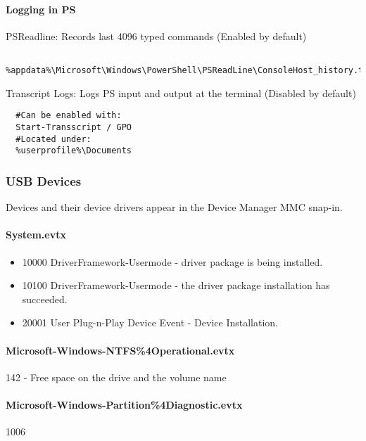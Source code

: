 \paragraph{Logging in PS}
PSReadline: Records last 4096 typed commands (Enabled by default)
\begin{lstlisting}
  %appdata%\Microsoft\Windows\PowerShell\PSReadLine\ConsoleHost_history.txt
\end{lstlisting}
Transcript Logs: Logs PS input and output at the terminal (Disabled by default)
\begin{lstlisting}
  #Can be enabled with:
  Start-Transscript / GPO
  #Located under:
  %userprofile%\Documents
\end{lstlisting}

\subsubsection{USB Devices}
Devices and their device drivers appear in the Device Manager MMC snap-in.
\paragraph{System.evtx}
\begin{itemize}
  \item 10000 DriverFramework-Usermode - driver package is being installed.
  \item 10100 DriverFramework-Usermode - the driver package installation has succeeded.
  \item 20001 User Plug-n-Play Device Event - Device Installation.
\end{itemize}
\paragraph{Microsoft-Windows-NTFS\%4Operational.evtx}
142 - Free space on the drive and the volume name
\paragraph{Microsoft-Windows-Partition\%4Diagnostic.evtx}
1006